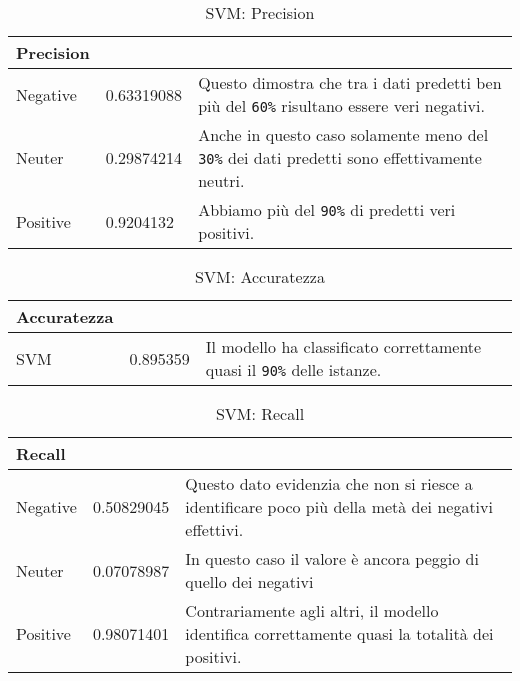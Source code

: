 		\begin{table} [H]
			\caption{SVM: Precision}
			\label{tab:precisionSVM}
			\centering
			\begin{tabular}{llp{}}
				\toprule 
				\textbf{Precision}	\\
				\midrule
				Negative  & 0.63319088  & Questo dimostra che tra i dati predetti ben più del \verb|60%| risultano essere veri negativi.\\
				Neuter & 0.29874214 & Anche in questo caso solamente meno del \verb|30%| dei dati predetti sono effettivamente neutri.\\
				Positive & 0.9204132 & Abbiamo più del \verb|90%| di predetti veri positivi.\\
				\bottomrule
			\end{tabular}
		\end{table}
		
		\begin{table}[H]
			\caption{SVM: Accuratezza}
			\label{tab:accSVM}
			\centering
			\begin{tabular}{llp{}}
				\toprule 
				\textbf{Accuratezza}	\\
				\midrule
				SVM  & 0.895359 & Il modello ha classificato correttamente quasi il \verb|90%| delle istanze.\\
				\bottomrule
			\end{tabular}
		\end{table}
		
		\begin{table}[H]
			\caption{SVM: Recall}
			\label{tab:RecallSVM}
			\centering
			\begin{tabular}{llp{}}
				\toprule 
				\textbf{Recall}	\\
				\midrule
				Negative  & 0.50829045  & Questo dato evidenzia che non si riesce a identificare poco più della metà dei negativi effettivi.\\
				Neuter & 0.07078987 & In questo caso il valore è ancora peggio di quello dei negativi\\
				Positive & 0.98071401 & Contrariamente agli altri, il modello identifica correttamente quasi la totalità dei positivi.\\
				\bottomrule
			\end{tabular}
		\end{table}
		
